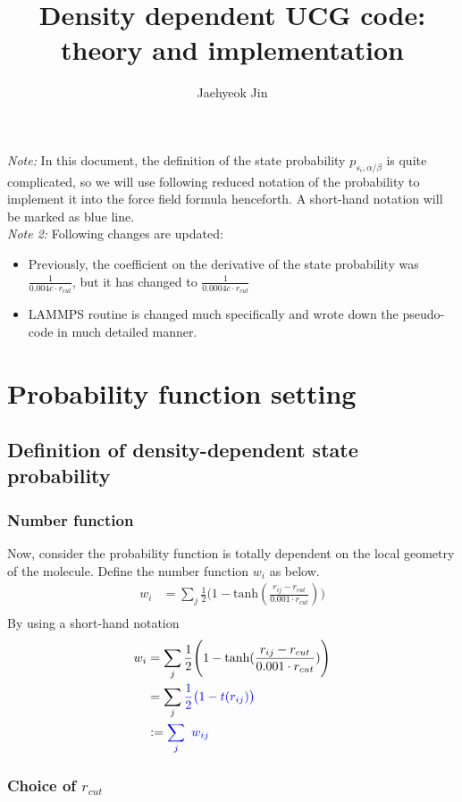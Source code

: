 \documentclass[11pt, oneside]{article}   	%
\title{Density dependent UCG code: theory and implementation}
\author{Jaehyeok Jin}
\begin{document}
\maketitle \noindent 
\textit{Note: } In this document, the definition of the state probability $p_{s_i,\alpha/\beta}$ is quite complicated, so we will use following reduced notation of the probability to implement it into the force field formula henceforth. A short-hand notation will be marked as {\color{blue} blue line.} \\ \noindent
\textit{Note 2:} Following changes are updated: 
\begin{itemize}
\item{Previously, the coefficient on the derivative of the state probability was $\frac{1}{0.004c\cdot r_{cut}}$, but it has changed to $\frac{1}{0.0004c\cdot r_{cut}}$}
\item{LAMMPS routine is changed much specifically and wrote down the pseudo-code in much detailed manner.}
\end{itemize}
\section{Probability function setting}
\subsection{Definition of density-dependent state probability}
\subsubsection{Number function}
Now, consider the probability function is totally dependent on the local geometry of the molecule. 
Define the number function $w_i$ as below.
\begin{align*}
w_i &= \sum_j  \frac{1}{2} \Biggl(1-\textrm{tanh}(\frac{r_{ij} - r_{cut}}{0.001 \cdot r_{cut}}) \Biggr)\\
\end{align*}
By using a {\color{blue} short-hand notation}
\begin{align*}
w_i &= \sum_j  \frac{1}{2} \Biggl(1-\textrm{tanh}(\frac{r_{ij} - r_{cut}}{0.001 \cdot r_{cut}}) \Biggr)\\
&= \sum_j  \color {blue}\frac{1}{2} \bigl( 1 - t(r_{ij}) \bigr) \\
&:=\color{blue} \sum_j \ w_{ij}
\end{align*}
\subsubsection{Choice of $r_{cut}$} 
\end{document}
